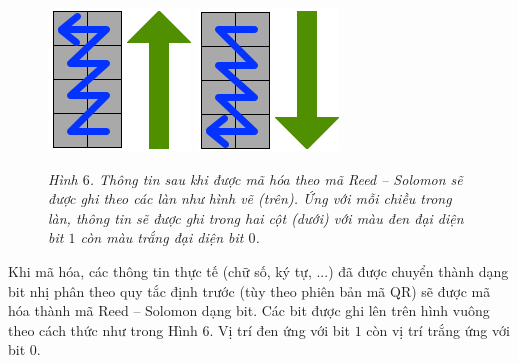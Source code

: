 \begin{multicols}{2}
\begin{figure}[H]
		\includegraphics[height=0.33\linewidth]{12}
		\includegraphics[height=0.33\linewidth]{13}
		\caption{\small\textit{\color{toanhocdoisong}Hình $6$. Thông tin sau khi được mã hóa theo mã Reed -- Solomon sẽ được ghi theo các làn như hình vẽ (trên). Ứng với mỗi chiều trong làn, thông tin sẽ được ghi trong hai cột (dưới) với màu đen đại diện bit $1$ còn màu trắng đại diện bit $0$.}}
		\vspace*{-10pt}
	\end{figure}
	Khi mã hóa, các thông tin thực tế (chữ số, ký tự, ...) đã được chuyển thành dạng bit nhị phân theo quy tắc định trước (tùy theo phiên bản mã QR) sẽ được mã hóa thành mã Reed -- Solomon dạng bit. Các bit được ghi lên trên hình vuông theo cách thức như trong Hình $6$. Vị trí đen ứng với bit $1$ còn vị trí trắng ứng với bit $0$.
	

\end{multicols}

